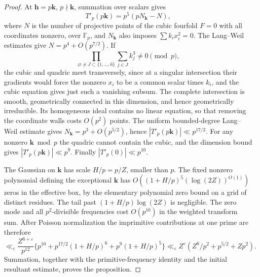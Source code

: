 \documentclass[11pt,letterpaper]{article}
\theoremstyle{definition}
\begin{document}
\begin{proof}
At $\mathbf h=p\mathbf k$, $p\nmid\mathbf k$, summation over scalars gives
\[
 T'_p(p\mathbf k)=p^5(pN_{\mathbf k}-N),
\]
where $N$ is the number of projective points of the cubic fourfold $F=0$
with all coordinates nonzero, over $\mathbb F_p$, and $N_{\mathbf k}$
also imposes $\sum k_i x_i^2=0$. The Lang--Weil estimates give
$N=p^4+O(p^{7/2})$. If
\[
                 \prod_{\varnothing\ne J\subset\{1,\ldots,6\}}
                           \sum_{j\in J} k_j^3\ne0\pmod p ,
\]
the cubic and quadric meet transversely, since at a singular intersection
their gradients would force the nonzero $x_i$ to be a common scalar
times $k_i$, and the cubic equation gives just such a vanishing subsum.
The complete intersection is smooth, geometrically connected in this
dimension, and hence geometrically irreducible. Its homogeneous ideal
contains no linear equation, so that removing the coordinate walls
costs $O(p^2)$ points. The uniform bounded-degree Lang--Weil estimate
gives $N_{\mathbf k}=p^3+O(p^{5/2})$, hence
$|T'_p(p\mathbf k)|\ll p^{17/2}$. For any nonzero $\mathbf k\bmod p$
the quadric cannot contain the cubic, and the dimension bound gives
$|T'_p(p\mathbf k)|\ll p^9$. Finally $|T'_p(0)|\ll p^{10}$.

The Gaussian on $\mathbf k$ has scale $H/p=p/Z$, smaller than $p$.
The fixed nonzero polynomial defining the exceptional $\mathbf k$
has $O((1+H/p)^5(\log(2Z))^{O(1)})$ zeros in the effective box,
by the elementary polynomial zero bound on a grid of distinct residues. The tail past $(1+H/p)\log(2Z)$ is negligible. The zero mode
and all $p^2$-divisible frequencies cost $O(p^{10})$ in the weighted
transform sum. After Poisson normalization the imprimitive contributions
at one prime are therefore
\[
 \ll_\varepsilon \frac{Z^{6+\varepsilon}}{p^{12}}
        \{p^{10}+p^{17/2}(1+H/p)^6+p^9(1+H/p)^5\}
 \ll_\varepsilon Z^\varepsilon(Z^6/p^2+p^{5/2}+Zp^2).
\]
Summation, together with the primitive-frequency identity and the
initial resultant estimate, proves the proposition.
\end{proof}
\end{document}
